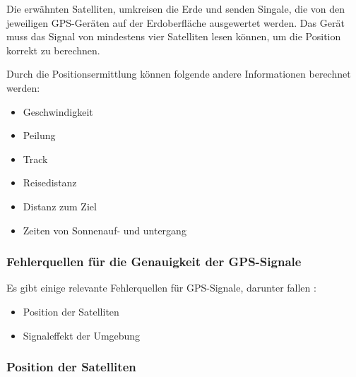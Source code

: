 Die erwähnten Satelliten, umkreisen die Erde und senden Singale, die von den jeweiligen GPS-Geräten auf der Erdoberfläche ausgewertet werden. Das Gerät muss das Signal von mindestens vier Satelliten lesen können, um die Position korrekt zu berechnen. \parencite{GPS} 

Durch die Positionsermittlung können folgende andere Informationen berechnet werden:

\begin{itemize}
	\item Geschwindigkeit
	\item Peilung
	\item Track
	\item Reisedistanz
	\item Distanz zum Ziel
	\item Zeiten von Sonnenauf- und untergang
\end{itemize}

\subsubsection{Fehlerquellen für die Genauigkeit der GPS-Signale}

Es gibt einige relevante Fehlerquellen für GPS-Signale, darunter fallen \parencite{GPSFehlerquellen}:
\begin{itemize}
	\item Position der Satelliten
	\item Signaleffekt der Umgebung
\end{itemize}

\newpage
\subsubsection{Position der Satelliten}


